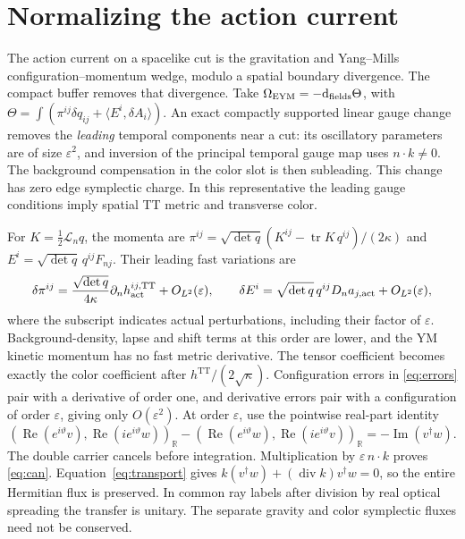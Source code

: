 \documentclass[11pt]{article}
\newcommand{\dd}{\mathrm d}
\newcommand{\eps}{\varepsilon}
\newcommand{\im}{\operatorname{Im}}
\newcommand{\re}{\operatorname{Re}}
\newcommand{\tr}{\operatorname{tr}}
\newcommand{\Div}{\operatorname{div}}
\newcommand{\TT}{\mathrm{TT}}
\begin{document}
\section{Normalizing the action current}
The action current \cite{leewald} on a spacelike cut is
the gravitation and Yang--Mills configuration--momentum
wedge, modulo a spatial boundary divergence. The compact
buffer removes that divergence. Take
\(\Omega_{\mathrm{EYM}}=-\dd_{\rm fields}\Theta\), with
\(\Theta=\int(\pi^{ij}\delta q_{ij}+\langle E^i,\delta A_i\rangle)\).
An exact compactly supported linear gauge change removes
the \emph{leading} temporal components near a cut: its
oscillatory parameters are of size \(\eps^2\), and inversion
of the principal temporal gauge map uses \(n\cdot k\ne0\).
The background compensation in the color slot is then
subleading. This change has zero edge symplectic charge.
In this representative the leading gauge conditions imply
spatial TT metric and transverse color.

For \(K=\tfrac12\mathcal L_nq\), the momenta are
\(\pi^{ij}=\sqrt{\det q}(K^{ij}-\tr K\,q^{ij})/(2\kappa)\)
and \(E^i=\sqrt{\det q}\,q^{ij}F_{nj}\).
Their leading fast variations are
\[
 \delta\pi^{ij}
   =\frac{\sqrt{\det q}}{4\kappa}\partial_n h_{\rm act}^{ij,\TT}
                  +O_{L^2}(\eps),\qquad
 \delta E^i
   =\sqrt{\det q}\,q^{ij}D_n a_{j,\rm act}
                  +O_{L^2}(\eps),
\]
where the subscript indicates actual perturbations,
including their factor of \(\eps\). Background-density,
lapse and shift terms at this order are lower, and
the YM kinetic momentum has no fast metric derivative.
The tensor coefficient becomes exactly the color
coefficient after \(h^\TT/(2\sqrt\kappa)\).
Configuration errors in \eqref{eq:errors} pair with a
derivative of order one, and derivative errors pair with a
configuration of order \(\eps\), giving only \(O(\eps^2)\).
At order \(\eps\), use the pointwise real-part identity
\[
 (\re(e^{i\vartheta}v),\re(ie^{i\vartheta}w))_{\mathbb R}
 -(\re(e^{i\vartheta}w),\re(ie^{i\vartheta}v))_{\mathbb R}
 =-\im(v^\dagger w).
\]
The double carrier cancels before integration.
Multiplication by \(\eps\,n\cdot k\) proves \eqref{eq:can}.
Equation~\eqref{eq:transport} gives
\(k(v^\dagger w)+(\Div k)v^\dagger w=0\), so the entire
Hermitian flux is preserved. In common ray labels after
division by real optical spreading the transfer is unitary.
The separate gravity and color symplectic fluxes need
not be conserved.
\end{document}
